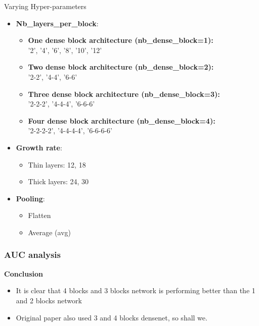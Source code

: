 \begin{flushleft}{Varying Hyper-parameters}
 \begin{itemize}
  \item \textbf{Nb\_layers\_per\_block}:
  \begin{itemize}
   \item \textbf{One dense block architecture (nb\_dense\_block=1):}\\
   '2', '4', '6', '8', '10', '12'
   \item \textbf{Two dense block architecture (nb\_dense\_block=2):}\\
   '2-2', '4-4', '6-6'
   \item \textbf{Three dense block architecture (nb\_dense\_block=3):}\\
   '2-2-2', '4-4-4', '6-6-6'
   \item \textbf{Four dense block architecture (nb\_dense\_block=4):}\\
   '2-2-2-2', '4-4-4-4', '6-6-6-6'
  \end{itemize}
 \item \textbf{Growth rate}:
  \begin{itemize}
  \item Thin layers: 12, 18    
  \item Thick layers: 24, 30    
 \end{itemize}
 \item \textbf{Pooling}:
 \begin{itemize}
  \item Flatten
  \item Average (avg)
 \end{itemize}  
 
\end{itemize}
 
\end{flushleft}

\flushbottom
\newpage

\subsubsection{AUC analysis}
  

\textbf{Conclusion}
\begin{itemize}
 \item It is clear that 4 blocks and 3 blocks network is performing better than the 1 and 2 blocks network
 \item Original paper also used 3 and 4 blocks densenet, so shall we.
\end{itemize}

